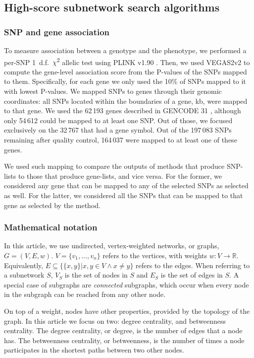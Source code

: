 \documentclass[twocolumn, 11pt]{article}
\begin{document}
\subsection{High-score subnetwork search algorithms}
\subsubsection{SNP and gene association}
\label{methods:node_score}
To measure association between a genotype and the phenotype, we performed a per-SNP 1~d.f.~\(\chi\)\textsuperscript{2} allelic test using PLINK v1.90 \cite{chang_second-generation_2015}. Then, we used VEGAS2v2 \cite{mishra_vegas2:_2015} to compute the gene-level association score from the P-values of the SNPs mapped to them. Specifically, for each gene we only used the 10\% of SNPs mapped to it with lowest P-values. We mapped SNPs to genes through their genomic coordinates: all SNPs located within the boundaries of a gene,  kb, were mapped to that gene. We used the 62\,193 genes described in GENCODE 31 \cite{frankish_gencode_2019}, although only 54\,612 could be mapped to at least one SNP. Out of those, we focused exclusively on the 32\,767 that had a gene symbol. Out of the 197\,083 SNPs remaining after quality control, 164\,037 were mapped to at least one of these genes. 

We used such mapping to compare the outputs of methods that produce SNP-lists to those that produce gene-lists, and vice versa. For the former, we considered any gene that can be mapped to any of the selected SNPs as selected as well. For the latter, we considered all the SNPs that can be mapped to that gene as selected by the method.

\subsubsection{Mathematical notation}
\label{methods:notation}
In this article, we use undirected, vertex-weighted networks, or graphs, $G = (V,E,w)$. $V = \{v_{1}, \dots{}, v_{n}\}$ refers to the vertices, with weights $w: V \rightarrow \mathbb{R}$. Equivalently, $E \subseteq \{\{x,y\} | x,y \in V \wedge x \neq y\}$ refers to the edges. When referring to a subnetwork $S$, $V_{S}$ is the set of nodes in $S$ and $E_{S}$ is the set of edges in $S$. A special case of subgraphs are \emph{connected} subgraphs, which occur when every node in the subgraph can be reached from any other node.

On top of a weight, nodes have other properties, provided by the topology of the graph. In this article we focus on two: degree centrality, and betweenness centrality. The degree centrality, or degree, is the number of edges that a node has. The betweenness centrality, or betweenness, is the number of times a node participates in the shortest paths between two other nodes.
\end{document}
